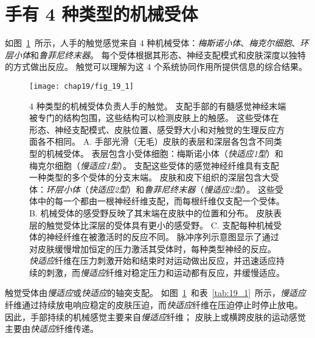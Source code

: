 \section{手有 4 种类型的机械受体}

如图~\ref{fig:19_1}~所示，人手的触觉感觉来自 4 种机械受体：\textit{梅斯诺小体}、\textit{梅克尔细胞}、\textit{环层小体}和\textit{鲁菲尼终末器}。
每个受体根据其形态、神经支配模式和皮肤深度以独特的方式做出反应。
触觉可以理解为这 4 个系统协同作用所提供信息的综合结果。


\begin{figure}[htbp]
	\centering
	\texttt{[image: chap19/fig\_19\_1]}
	\caption{4 种类型的机械受体负责人手的触觉。
		支配手部的有髓感觉神经末端被专门的结构包围，这些结构可以检测皮肤上的触感。
		这些受体在形态、神经支配模式、皮肤位置、感受野大小和对触觉的生理反应方面各不相同\cite{johansson1983tactile}。
		A. 手部光滑（无毛）皮肤的表层和深层各包含不同类型的机械受体。
		表层包含小受体细胞：梅斯诺小体（\textit{快适应1型}）和梅克尔细胞（\textit{慢适应1型}）。
		支配这些受体的感觉神经纤维具有支配一种类型的多个受体的分支末端。
		皮肤和皮下组织的深层包含大受体：\textit{环层小体}（\textit{快适应2型}）和\textit{鲁菲尼终末器}（\textit{慢适应2型}）。
		这些受体中的每一个都由一根神经纤维支配，而每根纤维仅支配一个受体。
		B. 机械受体的感受野反映了其末端在皮肤中的位置和分布。
		皮肤表层的触觉受体比深层的受体具有更小的感受野。
		C. 支配每种机械受体的神经纤维在被激活时的反应不同。
		脉冲序列示意图显示了通过对皮肤缓慢增加恒定的压力激活其受体时，每种类型神经的反应。
		\textit{快适应}纤维在压力刺激开始和结束时对运动做出反应，并迅速适应持续的刺激，而\textit{慢适应}纤维对稳定压力和运动都有反应，并缓慢适应。}
	\label{fig:19_1}
\end{figure}


触觉受体由\textit{慢适应}或\textit{快适应}的轴突支配。
如图~\ref{fig:19_1}~和表~\ref{tab:19_1}~所示，\textit{慢适应}纤维通过持续放电响应稳定的皮肤压迫，而\textit{快适应}纤维在压迫停止时停止放电。
因此，手部持续的机械感觉主要来自\textit{慢适应}纤维；
皮肤上或横跨皮肤的运动感觉主要由\textit{快适应}纤维传递。


